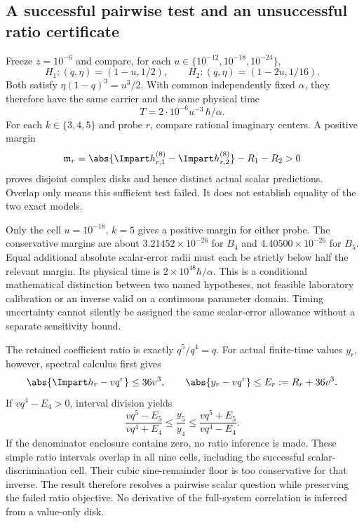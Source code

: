 \subsection{A successful pairwise test and an unsuccessful ratio certificate}
Freeze $z=10^{-6}$ and compare, for each $u\in\{10^{-12},10^{-18},10^{-24}\}$,
\begin{equation}
H_1:(q,\eta)=(1-u,1/2),\qquad H_2:(q,\eta)=(1-2u,1/16).
\label{eq:hypotheses}
\end{equation}
Both satisfy $\eta(1-q)^3=u^3/2$. With common independently fixed $\alpha$, they therefore have the same carrier and the same physical time
\begin{equation}
T=2\cdot10^{-6}u^{-3}\,\hbar/\alpha.
\label{eq:time2}
\end{equation}
For each $k\in\{3,4,5\}$ and probe $r$, compare rational imaginary centers. A positive margin
\begin{equation}
\mathfrak m_r=
\abs{\Impart h_{r,1}^{(8)}-\Impart h_{r,2}^{(8)}}-R_1-R_2>0
\label{eq:margin}
\end{equation}
proves disjoint complex disks and hence distinct actual scalar predictions. Overlap only means this sufficient test failed. It does not establish equality of the two exact models.

Only the cell $u=10^{-18}$, $k=5$ gives a positive margin for either probe. The conservative margins are about $3.21452\times10^{-26}$ for $B_4$ and $4.40500\times10^{-26}$ for $B_5$. Equal additional absolute scalar-error radii must each be strictly below half the relevant margin. Its physical time is $2\times10^{48}\hbar/\alpha$. This is a conditional mathematical distinction between two named hypotheses, not feasible laboratory calibration or an inverse valid on a continuous parameter domain. Timing uncertainty cannot silently be assigned the same scalar-error allowance without a separate sensitivity bound.

The retained coefficient ratio is exactly $q^5/q^4=q$. For actual finite-time values $y_r$, however, spectral calculus first gives
\begin{equation}
\abs{\Impart h_r-vq^r}\le36v^3,\qquad
\abs{y_r-vq^r}\le E_r:=R_r+36v^3.
\label{eq:ratioerror}
\end{equation}
If $vq^4-E_4>0$, interval division yields
\begin{equation}
\frac{vq^5-E_5}{vq^4+E_4}\le\frac{y_5}{y_4}\le
\frac{vq^5+E_5}{vq^4-E_4}.
\label{eq:ratio}
\end{equation}
If the denominator enclosure contains zero, no ratio inference is made. These simple ratio intervals overlap in all nine cells, including the successful scalar-discrimination cell. Their cubic sine-remainder floor is too conservative for that inverse. The result therefore resolves a pairwise scalar question while preserving the failed ratio objective. No derivative of the full-system correlation is inferred from a value-only disk.

